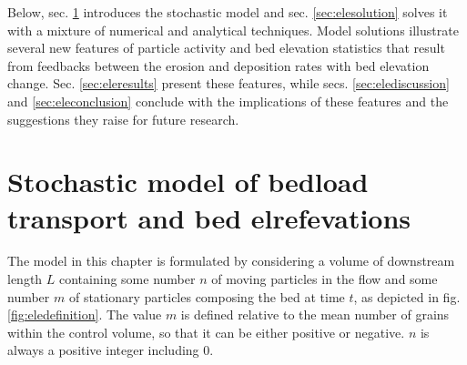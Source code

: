 Below, sec. \ref{sec:elemodel} introduces the stochastic model and sec. \ref{sec:elesolution} solves it with a mixture of numerical and analytical techniques. Model solutions illustrate several new features of particle activity and bed elevation statistics that result from feedbacks between the erosion and deposition rates with bed elevation change. Sec. \ref{sec:eleresults} present these features, while secs. \ref{sec:elediscussion} and \ref{sec:eleconclusion} conclude with the implications of these features and the suggestions they raise for future research.

\section{Stochastic model of bedload transport and bed elrefevations}
\label{sec:elemodel}

The model in this chapter is formulated by considering a volume of downstream length $L$ containing some number $n$ of moving particles in the flow and some number $m$ of stationary particles composing the bed at time $t$, as depicted in fig. \ref{fig:eledefinition}. The value $m$ is defined relative to the mean number of grains within the control volume, so that it can be either positive or negative. $n$ is always a positive integer including $0$.

